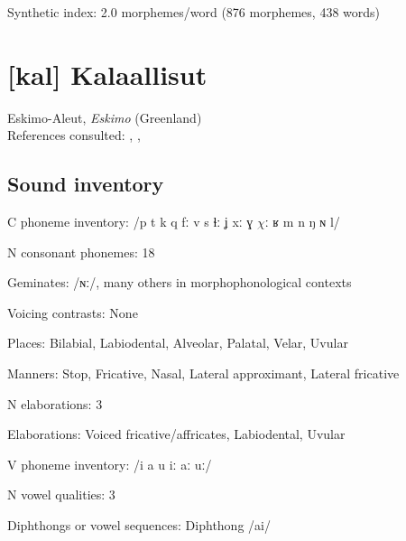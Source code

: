 {\begin{appendixdesc}
\item[Synthetic index:] 2.0 morphemes/word (876 morphemes, 438 words)
\end{appendixdesc}
\section*{[kal] Kalaallisut}  %
Eskimo-Aleut, \textit{Eskimo} (Greenland)\medskip\\
References consulted: \citet{Fortescue1984}, \citet{Hagerup2011}, \citet{Jacobsen2000}

\subsection*{Sound inventory}
\begin{appendixdesc}

\item[C phoneme inventory:] /p t k q fː v s ɬː ʝ xː ɣ $\chi ː$ ʁ m n ŋ ɴ l/

\item[N consonant phonemes:] 18

\item[Geminates:] /ɴː/, many others in morphophonological contexts

\item[Voicing contrasts:] None

\item[Places:] Bilabial, Labiodental, Alveolar, Palatal, Velar, Uvular

\item[Manners:] Stop, Fricative, Nasal, Lateral approximant, Lateral fricative 

\item[N elaborations:] 3

\item[Elaborations:] Voiced fricative/affricates, Labiodental, Uvular

\item[V phoneme inventory:] /i a u iː aː uː/

\item[N vowel qualities:] 3

\item[Diphthongs or vowel sequences:] Diphthong /ai/


\end{appendixdesc}}
